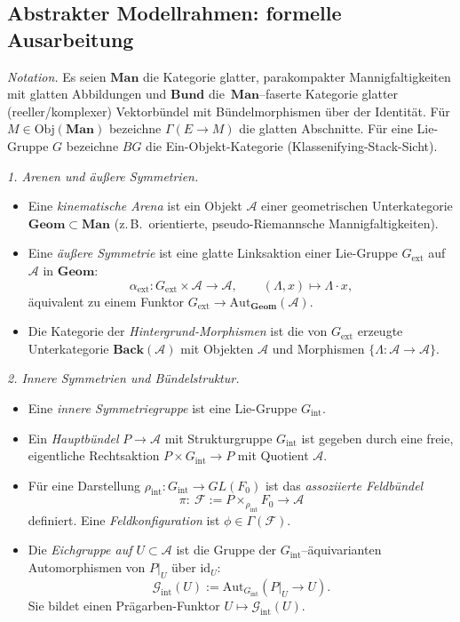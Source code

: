 \documentclass[10pt, letterpaper]{article}
\begin{document}
\subsection{Abstrakter Modellrahmen: formelle Ausarbeitung}

\emph{Notation.}
Es seien $\mathbf{Man}$ die Kategorie glatter, parakompakter Mannigfaltigkeiten mit glatten Abbildungen
und $\mathbf{Bund}$ die $\,\mathbf{Man}$–faserte Kategorie glatter (reeller/komplexer) Vektorbündel
mit Bündelmorphismen über der Identität. 
Für $M\in\mathrm{Obj}(\mathbf{Man})$ bezeichne $\Gamma(E\to M)$ die glatten Abschnitte.
Für eine Lie-Gruppe $G$ bezeichne $BG$ die Ein-Objekt-Kategorie (Klassenifying-Stack-Sicht).

\bigskip
\emph{1. Arenen und äußere Symmetrien.}
\begin{itemize}
\item Eine \emph{kinematische Arena} ist ein Objekt $\mathcal A$ einer geometrischen Unterkategorie
$\mathbf{Geom}\subset\mathbf{Man}$ (z.\,B.\ orientierte, pseudo-Riemannsche Mannigfaltigkeiten).
\item Eine \emph{äußere Symmetrie} ist eine glatte Linksaktion einer Lie-Gruppe $G_{\mathrm{ext}}$ auf $\mathcal A$ in $\mathbf{Geom}$:
\[
\alpha_{\mathrm{ext}}:G_{\mathrm{ext}}\times \mathcal A \to \mathcal A,\qquad
(\Lambda,x)\mapsto \Lambda\cdot x,
\]
äquivalent zu einem Funktor $G_{\mathrm{ext}}\to\mathrm{Aut}_{\mathbf{Geom}}(\mathcal A)$.
\item Die Kategorie der \emph{Hintergrund-Morphismen} ist die von $G_{\mathrm{ext}}$ erzeugte Unterkategorie
$\mathbf{Back}(\mathcal A)$ mit Objekten $\mathcal A$ und Morphismen $\{\Lambda:\mathcal A\to \mathcal A\}$.
\end{itemize}

\bigskip
\emph{2. Innere Symmetrien und Bündelstruktur.}
\begin{itemize}
\item Eine \emph{innere Symmetriegruppe} ist eine Lie-Gruppe $G_{\mathrm{int}}$.
\item Ein \emph{Hauptbündel} $P\to \mathcal A$ mit Strukturgruppe $G_{\mathrm{int}}$ ist gegeben durch eine freie, eigentliche Rechtsaktion
$P\times G_{\mathrm{int}}\to P$ mit Quotient $\mathcal A$.
\item Für eine Darstellung $\rho_{\mathrm{int}}:G_{\mathrm{int}}\to GL(F_0)$ ist das \emph{assoziierte Feldbündel}
\[
\pi:\ \mathcal F := P\times_{\rho_{\mathrm{int}}} F_0 \longrightarrow \mathcal A
\]
definiert. Eine \emph{Feldkonfiguration} ist $\phi\in\Gamma(\mathcal F)$.
\item Die \emph{Eichgruppe auf $U\subset\mathcal A$} ist die Gruppe der $G_{\mathrm{int}}$–äquivarianten Automorphismen von $P|_U$ über $\mathrm{id}_U$:
\[
\mathcal G_{\mathrm{int}}(U):=\mathrm{Aut}_{G_{\mathrm{int}}}(P|_U\to U).
\]
Sie bildet einen Prägarben-Funktor $U\mapsto\mathcal G_{\mathrm{int}}(U)$.
\end{itemize}
\end{document}

